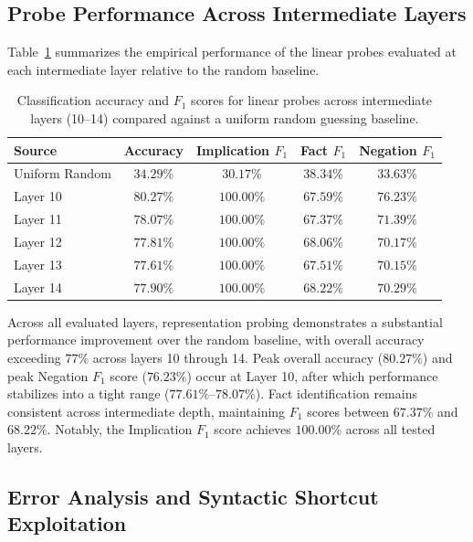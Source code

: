 \documentclass[12 pt]{article}  %
\begin{document}
\subsection{Probe Performance Across Intermediate Layers}

Table~\ref{tbl:results-summary} summarizes the empirical performance of the 
linear probes evaluated at each intermediate layer relative to the random 
baseline.

\begin{table}[ht!]
\centering
\begin{tabular}{lcccc}
\hline
\textbf{Source} & \textbf{Accuracy} & \textbf{Implication $F_1$} & \textbf{Fact $F_1$} & \textbf{Negation $F_1$} \\ \hline
Uniform Random & $34.29\%$ & $30.17\%$ & $38.34\%$ & $33.63\%$ \\
Layer 10       & $\mathbf{80.27\%}$ & $\mathbf{100.00\%}$ & $67.59\%$ & $\mathbf{76.23\%}$ \\
Layer 11       & $78.07\%$ & $\mathbf{100.00\%}$ & $67.37\%$ & $71.39\%$ \\
Layer 12       & $77.81\%$ & $\mathbf{100.00\%}$ & $\mathbf{68.06\%}$ & $70.17\%$ \\
Layer 13       & $77.61\%$ & $\mathbf{100.00\%}$ & $67.51\%$ & $70.15\%$ \\
Layer 14       & $77.90\%$ & $\mathbf{100.00\%}$ & $68.22\%$ & $70.29\%$ \\ \hline
\end{tabular}
\caption{Classification accuracy and $F_1$ scores for linear probes across intermediate layers (10--14) compared against a uniform random guessing baseline.}
\label{tbl:results-summary}
\end{table}

Across all evaluated layers, representation probing demonstrates a substantial 
performance improvement over the random baseline, with overall accuracy 
exceeding $77\%$ across layers 10 through 14. Peak overall accuracy ($80.27\%$) 
and peak Negation $F_1$ score ($76.23\%$) occur at Layer 10, after which 
performance stabilizes into a tight range ($77.61\%$--$78.07\%$). Fact 
identification remains consistent across intermediate depth, maintaining $F_1$ 
scores between $67.37\%$ and $68.22\%$. Notably, the Implication $F_1$ score 
achieves $100.00\%$ across all tested layers.

\subsection{Error Analysis and Syntactic Shortcut Exploitation}
\end{document}
